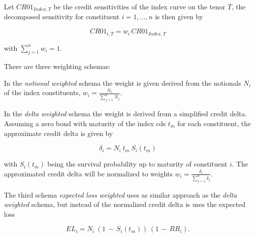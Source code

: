 Let $CR01_{Index,T}$ be the credit sensitivities of the index curve on the tenor $T$, the decomposed sensitivity for constituent $i=1,...,n$ is 
then given by

$$ CR01_{i, T} = w_i \, CR01_{Index,T}$$

with $\sum_{j=1}^n w_i = 1$.

There are three weighting schemas:

In the \emph{notional weighted} schema the weight is given derived from the notionals $N_i$ of the index constituents, $w_i = \frac{N_i}{\sum_{j=1}^n N_j}$. 

In the \emph{delta weighted} schema the weight is derived from a simplified credit delta. Assuming a zero bond with maturity of the index cds $t_m$ for each constituent,
the approximate credit delta is given by

$$ \delta_i = N_i \: t_m \: S_i(t_m) $$

with $S_i(t_m)$ being the survival probability up to maturity of constituent $i$. 
The approximated credit delta will be normalized to weights $w_i = \frac{\delta_i}{\sum_{j=1}^n \delta_j}$.

The third schema \emph{expected loss weighted} uses as similar approach as the \emph{delta weighted} schema, but instead of the normalized credit delta is uses the expected loss

$$EL_i = N_i \: (1 \, - \, S_i(t_m)) \: (1 \, - \, RR_i).$$



